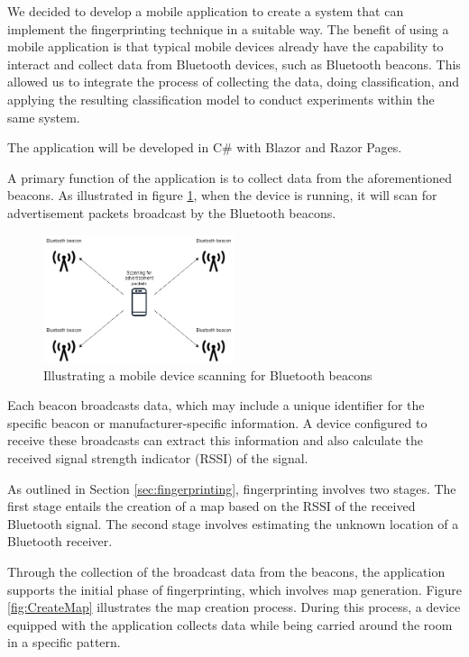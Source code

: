 We decided to develop a mobile application to create a system that can implement the fingerprinting technique in a suitable way.
The benefit of using a mobile application is that typical mobile devices already have the capability to interact and collect data from Bluetooth devices, such as Bluetooth beacons. 
This allowed us to integrate the process of collecting the data, doing classification, and applying the resulting classification model to conduct experiments within the same system.

The application will be developed in C\#\cite{billwagnerDocsGetStarted} with Blazor\cite{BlazorBuildClient} and Razor Pages\cite{tdykstraIntroductionRazorPages2023}.

A primary function of the application is to collect data from the aforementioned beacons. 
As illustrated in figure \ref{fig:ScanAdvertisement}, when the device is running, it will scan for advertisement packets broadcast by the Bluetooth beacons.

\begin{figure}[H]
    \centering
    \includegraphics[width=0.5\textwidth]{images/ScanningForAdvertisement.drawio.png}
    \caption{Illustrating a mobile device scanning for Bluetooth beacons}
    \label{fig:ScanAdvertisement}
\end{figure}

Each beacon broadcasts data, which may include a unique identifier for the specific beacon or manufacturer-specific information.
A device configured to receive these broadcasts can extract this information and also calculate the received signal strength indicator (RSSI) of the signal.

As outlined in Section \ref{sec:fingerprinting}, fingerprinting involves two stages.
The first stage entails the creation of a map based on the RSSI of the received Bluetooth signal. The second stage involves estimating the unknown location of a Bluetooth receiver.

Through the collection of the broadcast data from the beacons, the application supports the initial phase of fingerprinting, which involves map generation.
Figure \ref{fig:CreateMap} illustrates the map creation process. During this process, a device equipped with the application collects data while being carried around the room in a specific pattern.

